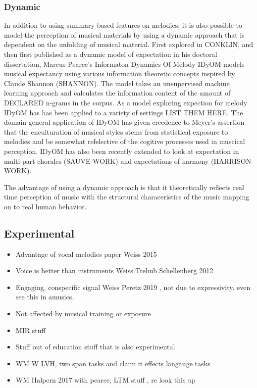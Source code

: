 \documentclass[]{book}
\begin{document}
\hypertarget{dynamic}{%
\subsubsection{Dynamic}\label{dynamic}}

In addition to using summary based features on melodies, it is also possible to model the perception of musical materials by using a dynamic approach that is dependent on the unfolding of musical material.
First explored in CONKLIN, and then first published as a dynamic model of expectation in his doctoral dissertation, Marcus Pearce's Informaton Dynamics Of Melody IDyOM models musical expectancy using various information theoretic concepts inspired by Claude Shannon (SHANNON).
The model takes an unsupervised machine learning approach and calculates the information content of the amount of DECLARED n-grams in the corpus.
As a model exploring expection for melody IDyOM has has been applied to a variety of settings LIST THEM HERE.
The domain general application of IDyOM has given creedence to Meyer's assertion that the enculturation of musical styles stems from statistical exposure to melodies and be somewhat refelective of the cogitive processes used in muscical perception.
IDyOM has also been recently extended to look at expectation in multi-part chorales (SAUVE WORK) and expectations of harmony (HARRISON WORK).

\citep{pearceAuditoryExpectationInformation2012}

The advantage of using a dynamic approach is that it theoretically reflects real time perception of music with the structural characeristics of the music mapping on to real human behavior.

\hypertarget{experimental}{%
\subsection{Experimental}\label{experimental}}

\begin{itemize}
\item
  Advantage of vocal melodies paper \textbar{} Weiss 2015
\item
  Voice is better than instruments Weiss Trehub Schellenberg 2012
\item
  Engaging, conspecific signal Weiss Peretz 2019 , not due to expressivity. even see this in amusics.
\item
  Not affected by musical training or exposure
\item
  MIR stuff
\item
  Stuff out of education stuff that is also experimental
\item
  WM W LVH, two span tasks and claim it effects langauge tasks
\item
  WM Halpern 2017 with pearce, LTM stuff , re look this up
\end{itemize}
\end{document}

